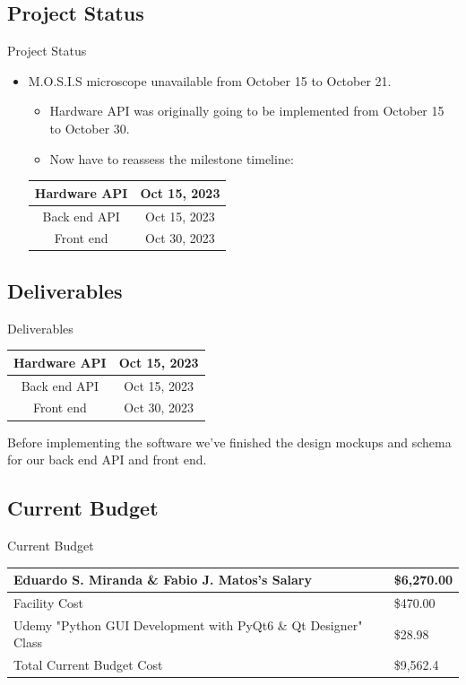 \documentclass[17pt, aspectratio=169]{beamer}
\begin{document}
\subsection{Project Status}
\begin{frame}{Project Status}
	\begin{itemize}
		\item M.O.S.I.S microscope unavailable from October 15 to October 21.
		      \begin{itemize}
			      \item Hardware API was originally going to be implemented from October 15 to October 30.
			      \item Now have to reassess the milestone timeline:
		      \end{itemize}
		      \begin{center}
			      \begin{tabular}{||c | c||}
				      \hline
				      Hardware API & Oct 15, 2023 \\
				      \hline
				      Back end API & Oct 15, 2023 \\
				      \hline
				      Front end    & Oct 30, 2023 \\
				      \hline
			      \end{tabular}
		      \end{center}
	\end{itemize}
\end{frame}
\subsection*{Deliverables}
\begin{frame}{Deliverables}
	\begin{center}
		\begin{tabular}{||c | c||}
			\hline
			Hardware API & Oct 15, 2023 \\
			\hline
			Back end API & Oct 15, 2023 \\
			\hline
			Front end    & Oct 30, 2023 \\
			\hline
		\end{tabular}
	\end{center}
	Before implementing the software we've finished the design mockups and schema for our back end API and front end.
\end{frame}
\subsection*{Current Budget}
\begin{frame}{Current Budget}
	\begin{center}
		\begin{tabular}{||m{} | m{} ||}
			\hline
			Eduardo S. Miranda \& Fabio J. Matos's Salary& \$6,270.00\\
			\hline
			Facility Cost & \$470.00 \\
			\hline
			Udemy "Python GUI Development with PyQt6 \& Qt Designer" Class & \$28.98 \\
			\hline
			Total Current Budget Cost & \$9,562.4\\
			\hline
		\end{tabular}
\end{center}
\end{frame}
\end{document}
